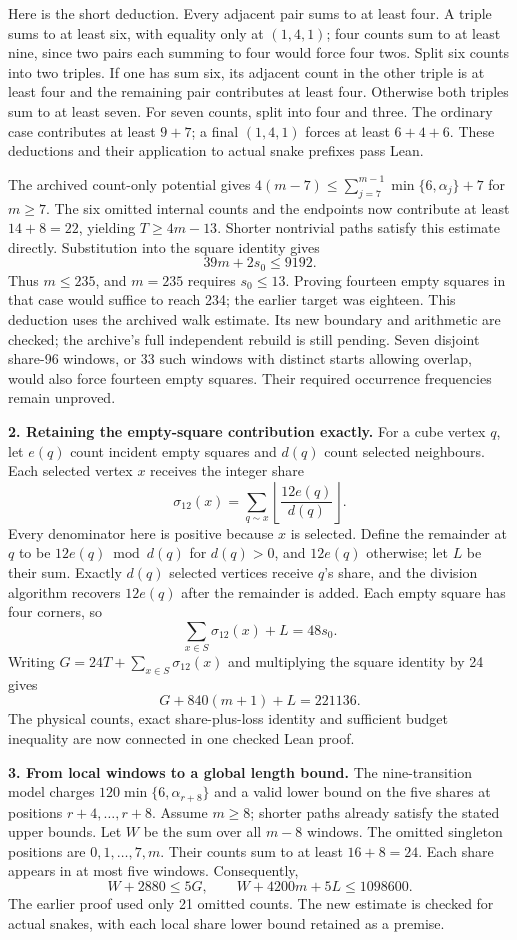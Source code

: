\documentclass[11pt,a4paper]{article}
\begin{document}
Here is the short deduction. Every adjacent pair sums to at least four.
A triple sums to at least six, with equality only at $(1,4,1)$; four
counts sum to at least nine, since two pairs each summing to four would
force four twos. Split six counts into two triples. If one has sum six,
its adjacent count in the other triple is at least four and the remaining
pair contributes at least four. Otherwise both triples sum to at least
seven. For seven counts, split into four and three. The ordinary case
contributes at least $9+7$; a final $(1,4,1)$ forces at least $6+4+6$.
These deductions and their application to actual snake prefixes pass Lean.

The archived count-only potential gives
$4(m-7)\le\sum_{j=7}^{m-1}\min\{6,\alpha_j\}+7$ for $m\ge7$.
The six omitted internal counts and the endpoints now contribute at
least $14+8=22$, yielding $T\ge4m-13$. Shorter nontrivial paths satisfy
this estimate directly. Substitution into the square identity gives
\[
\boxed{39m+2s_0\le9192.}
\]
Thus $m\le235$, and $m=235$ requires $s_0\le13$. Proving fourteen empty
squares in that case would suffice to reach 234; the earlier target was
eighteen. This deduction uses the archived walk estimate. Its new boundary
and arithmetic are checked; the archive's full independent rebuild is
still pending. Seven disjoint share-96 windows, or 33 such windows with
distinct starts allowing overlap, would also force fourteen empty squares.
Their required occurrence frequencies remain unproved.

\textbf{2. Retaining the empty-square contribution exactly.}
For a cube vertex $q$, let $e(q)$ count incident empty squares and $d(q)$
count selected neighbours. Each selected vertex $x$ receives the integer share
\[
\sigma_{12}(x)=\sum_{q\sim x}\left\lfloor\frac{12e(q)}{d(q)}\right\rfloor.
\]
Every denominator here is positive because $x$ is selected. Define the
remainder at $q$ to be $12e(q)\bmod d(q)$ for $d(q)>0$, and $12e(q)$
otherwise; let $L$ be their sum. Exactly $d(q)$ selected vertices receive
$q$'s share, and the division algorithm recovers $12e(q)$ after the
remainder is added. Each empty square has four corners, so
\[
\sum_{x\in S}\sigma_{12}(x)+L=48s_0.
\]
Writing $G=24T+\sum_{x\in S}\sigma_{12}(x)$ and multiplying the square
identity by 24 gives
\[
\boxed{G+840(m+1)+L=221136.}
\]
The physical counts, exact share-plus-loss identity and sufficient budget
inequality are now connected in one checked Lean proof.

\textbf{3. From local windows to a global length bound.}
The nine-transition model charges $120\min\{6,\alpha_{r+8}\}$ and a
valid lower bound on the five shares at positions $r+4,\ldots,r+8$.
Assume $m\ge8$; shorter paths already satisfy the stated upper bounds.
Let $W$ be the sum over all $m-8$ windows. The omitted singleton positions
are $0,1,\ldots,7,m$. Their counts sum to at least $16+8=24$.
Each share appears in at most five windows. Consequently,
\[
W+2880\le5G,\qquad W+4200m+5L\le1098600.
\]
The earlier proof used only 21 omitted counts. The new estimate is checked
for actual snakes, with each local share lower bound retained as a premise.
\end{document}
